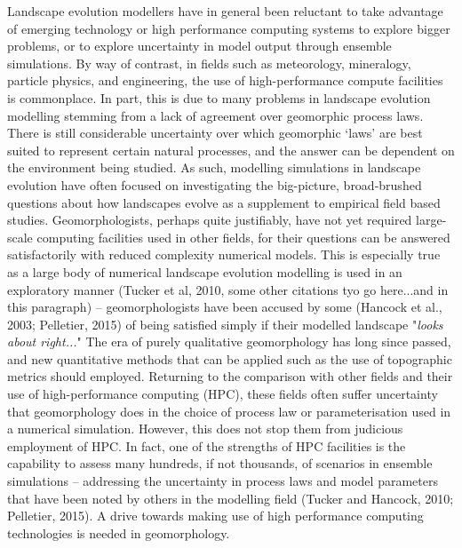 Landscape evolution modellers have in general been reluctant to take advantage of emerging technology or high performance computing systems to explore bigger problems, or to explore uncertainty in model output through ensemble simulations. By way of contrast, in fields such as meteorology, mineralogy, particle physics, and engineering, the use of high-performance compute facilities is commonplace. In part, this is due to many problems in landscape evolution modelling stemming from a lack of agreement over geomorphic process laws. There is still considerable uncertainty over which geomorphic `laws' are best suited to represent certain natural processes, and the answer can be dependent on the environment being studied. As such, modelling simulations in landscape evolution have often focused on investigating the big-picture, broad-brushed questions about how landscapes evolve as a supplement to empirical field based studies. Geomorphologists, perhaps quite justifiably, have not yet required large-scale computing facilities used in other fields, for their questions can be answered satisfactorily with reduced complexity numerical models. This is especially true as a large body of numerical landscape evolution modelling is used in an exploratory manner (Tucker et al, 2010, some other citations tyo go here...and in this paragraph) -- geomorphologists have been accused by some (Hancock et al., 2003; Pelletier, 2015) of being satisfied simply if their modelled landscape "\textit{looks about right...}" The era of purely qualitative geomorphology has long since passed, and new quantitative methods that can be applied such as the use of topographic metrics should employed. Returning to the comparison with other fields and their use of high-performance computing (HPC), these fields often suffer uncertainty that geomorphology does in the choice of process law or parameterisation used in a numerical simulation. However, this does not stop them from judicious employment of HPC. In fact, one of the strengths of HPC facilities is the capability to assess many hundreds, if not thousands, of scenarios in ensemble simulations -- addressing the uncertainty in  process laws and model parameters that have been noted by others in the modelling field (Tucker and Hancock, 2010; Pelletier, 2015).  A drive towards making use of high performance computing technologies is needed in geomorphology.
